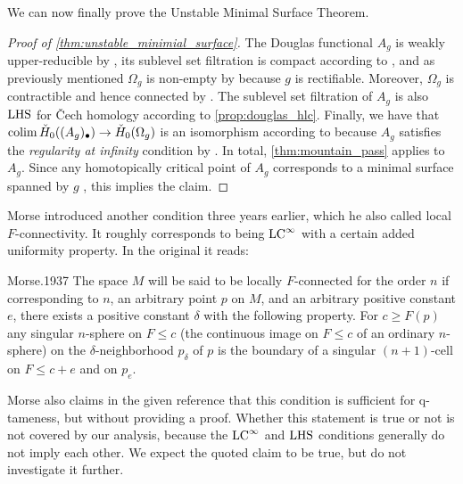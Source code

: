 We can now finally prove the Unstable Minimal Surface Theorem.


\begin{proof}[Proof of \cref{thm:unstable_minimial_surface}]
    The Douglas functional $A_g$ is weakly upper-reducible by \cite[Theorem 5.1]{Morse.1939}, its sublevel set filtration is compact according to \cite[p.~448]{Morse.1939}, and as previously mentioned $\Omega_g$ is non-empty by \cite[p.~267-268]{Douglas.1931} because $g$ is rectifiable.
    Moreover, $\Omega_g$ is contractible and hence connected by \cite[Theorem 4.3]{Morse.1939}.
    The sublevel set filtration of $A_g$ is also $\mathrm{LHS}$ for \v{C}ech homology according to \cref{prop:douglas_hlc}.
    Finally, we have that $\operatorname*{colim} \check{H}_0((A_g)_{\bullet}) \to \check{H}_0(\Omega_g)$ is an isomorphism according to \cite[p.~444]{Morse.1939} because $A_g$ satisfies the \emph{regularity at infinity} condition by \cite[Theorem 4.3]{Morse.1939}.
    In total, \cref{thm:mountain_pass} applies to $A_g$.
    Since any homotopically critical point of $A_g$ corresponds to a minimal surface spanned by $g$ \cite[Theorem 6.2]{Morse.1939}, this implies the claim.
\end{proof}

\begin{rem}
Morse introduced another condition three years earlier, which he also called local $F$-connectivity.
It roughly corresponds to being $\mathrm{LC}^\infty$ with a certain added uniformity property.
In the original it reads:
\begin{displaycquote}[p.421--422]{Morse.1937}
	The space $M$ will be said to be locally $F$-connected for the order $n$ if corresponding to $n$, an arbitrary point $p$ on $M$, and an arbitrary positive constant $e$, there exists a positive constant $\delta$ with the following property.
	For $c \geq F(p)$ any singular $n$-sphere on $F \leq c$ (the continuous image on $F \leq c$ of an ordinary $n$-sphere) on the $\delta$-neighborhood $p_{\delta}$ of $p$ is the boundary of a singular $(n + 1)$-cell on $F \leq c + e$ and on $p_e$.
\end{displaycquote}
Morse also claims in the given reference that this condition is sufficient for q-tameness, but without providing a proof.
Whether this statement is true or not is not covered by our analysis, because the $\mathrm{LC}^\infty$ and $\mathrm{LHS}$ conditions generally do not imply each other.
We expect the quoted claim to be true, but do not investigate it further.
\end{rem}